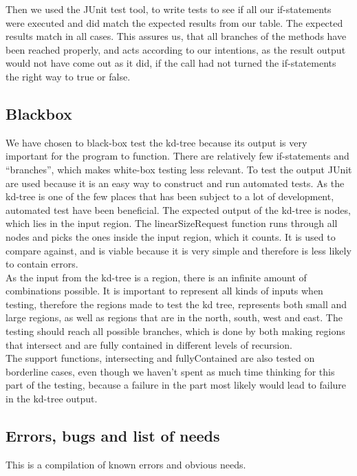 \documentclass[a4paper,10pt,titlepage]{article}
\begin{document}
Then we used the JUnit test tool, to write tests to see if all our if-statements were executed and did match the expected results from our table. The expected results match in all cases. This assures us, that all branches of the methods have been reached properly, and acts according to our intentions, as the result output would not have come out as it did, if the call had not turned the if-statements the right way to true or false.


		\subsection{Blackbox}
		We have chosen to black-box test the kd-tree because its output is very important for the program to function. There are relatively few if-statements and “branches”, which makes white-box testing less relevant.
To test the output JUnit are used because it is an easy way to construct and run automated tests. As the kd-tree is one of the few places that has been subject to a lot of development, automated test have been beneficial. The expected output of the kd-tree is nodes, which lies in the input region. The linearSizeRequest function runs through all nodes and picks the ones inside the input region, which it counts. It is used to compare against, and is viable because it is very simple and therefore is less likely to contain errors.\\
As the input from the kd-tree is a region, there is an infinite amount of combinations possible. It is important to represent all kinds of inputs when testing, therefore the regions made to test the kd tree, represents both small and large regions, as well as regions that are in the north, south, west and east. The testing should reach all possible branches, which is done by both making regions that intersect and are fully contained in different levels of recursion.\\
The support functions, intersecting and fullyContained are also tested on borderline cases, even though we haven’t spent as much time thinking for this part of the testing, because a failure in the part most likely would lead to failure in the kd-tree output.\\

			
		\subsection{Errors, bugs and list of needs}
		This is a compilation of known errors and obvious needs.
\end{document}
